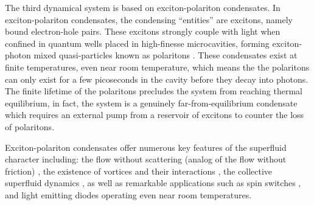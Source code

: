 {
The third dynamical system is based on exciton-polariton condensates.  
In exciton-polariton condensates, the condensing ``entities'' are excitons, namely
bound electron-hole pairs.  These excitons strongly couple with light when confined in quantum wells placed in
high-finesse microcavities, forming exciton-photon mixed quasi-particles known
as polaritons \cite{RMP}.  These condensates exist at finite temperatures, even near room temperature, which means the the polaritons can only exist for a few picoseconds in the cavity before they decay into photons.  The finite lifetime of the polaritons precludes the system from reaching thermal equilibrium, in fact, the system is a genuinely far-from-equilibrium condensate which requires an external pump from a reservoir of excitons to counter the loss of polaritons.

Exciton-polariton condensates offer numerous key features of the superfluid 
character including: the flow without scattering (analog of the flow without friction) \cite{amo1},
the existence of vortices \cite{lagou1}
and their interactions \cite{roumpos,roumpos2},
the collective superfluid dynamics \cite{amo2},
as well as remarkable applications such as spin switches \cite{amo3},
and light emitting diodes \cite{amo4} operating even near room temperatures.

}
